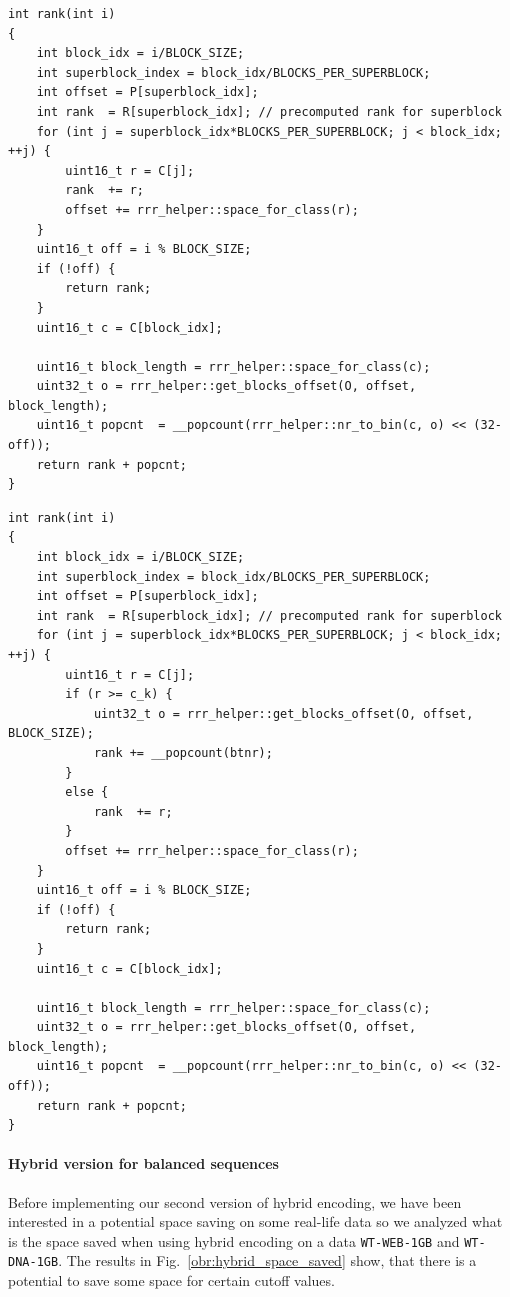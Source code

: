 \begin{lstlisting}
int rank(int i)
{
	int block_idx = i/BLOCK_SIZE;
	int superblock_index = block_idx/BLOCKS_PER_SUPERBLOCK;
	int offset = P[superblock_idx];
	int rank  = R[superblock_idx]; // precomputed rank for superblock
	for (int j = superblock_idx*BLOCKS_PER_SUPERBLOCK; j < block_idx; ++j) {
		uint16_t r = C[j];
		rank  += r;
		offset += rrr_helper::space_for_class(r);
	}
	uint16_t off = i % BLOCK_SIZE;
	if (!off) {
		return rank;
	}
	uint16_t c = C[block_idx];

	uint16_t block_length = rrr_helper::space_for_class(c);
	uint32_t o = rrr_helper::get_blocks_offset(O, offset, block_length);
	uint16_t popcnt  = __popcount(rrr_helper::nr_to_bin(c, o) << (32-off));
	return rank + popcnt;
}
\end{lstlisting}

\begin{lstlisting}
int rank(int i)
{
	int block_idx = i/BLOCK_SIZE;
	int superblock_index = block_idx/BLOCKS_PER_SUPERBLOCK;
	int offset = P[superblock_idx];
	int rank  = R[superblock_idx]; // precomputed rank for superblock
	for (int j = superblock_idx*BLOCKS_PER_SUPERBLOCK; j < block_idx; ++j) {
		uint16_t r = C[j];
		if (r >= c_k) {
			uint32_t o = rrr_helper::get_blocks_offset(O, offset, BLOCK_SIZE);
			rank += __popcount(btnr);
		}
		else {
			rank  += r;
		}
		offset += rrr_helper::space_for_class(r);
	}
	uint16_t off = i % BLOCK_SIZE;
	if (!off) {
		return rank;
	}
	uint16_t c = C[block_idx];

	uint16_t block_length = rrr_helper::space_for_class(c);
	uint32_t o = rrr_helper::get_blocks_offset(O, offset, block_length);
	uint16_t popcnt  = __popcount(rrr_helper::nr_to_bin(c, o) << (32-off));
	return rank + popcnt;
}
\end{lstlisting}

\paragraph{Hybrid version for balanced sequences}

Before implementing our second version of hybrid encoding, we have been interested in a potential
space saving on some real-life data so we analyzed what is the space saved when using hybrid encoding
on a data \texttt{WT-WEB-1GB} and \texttt{WT-DNA-1GB}. The results in Fig.~\ref{obr:hybrid_space_saved}
show, that there is a potential to save some space for certain cutoff values.

